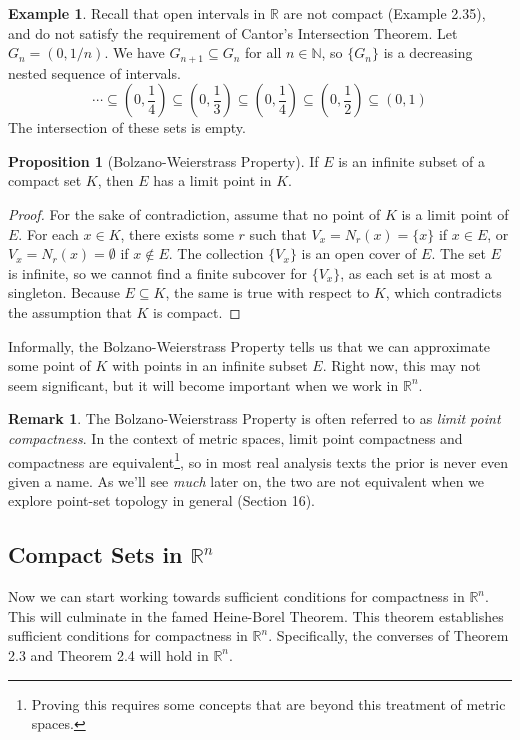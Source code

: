 \documentclass{article}
\newcommand{\N}{\mathbb{N}}
\newcommand{\R}{\mathbb{R}}
\theoremstyle{definition}
\newtheorem{proposition}{Proposition}[section]
\newtheorem{example}{Example}[section]
\newtheorem{remark}{Remark}[section]
\begin{document}
	\begin{example}
		Recall that open intervals in $ \R $ are not compact (Example 2.35), and do not satisfy the requirement of Cantor's Intersection Theorem. Let $ G_{n}=(0,1/n) $. We have $ G_{n+1}\subseteq G_{n} $ for all $ n\in\N $, so $ \{G_n\} $ is a decreasing nested sequence of intervals. $$ \cdots\subseteq \left(0,\frac{1}{4}\right)\subseteq\left(0,\frac{1}{3}\right)\subseteq\left(0,\frac{1}{4}\right)\subseteq\left(0,\frac{1}{2}\right)\subseteq(0,1)$$  
		The intersection of these sets is empty.	
	\end{example}
	\begin{proposition}[Bolzano-Weierstrass Property]
		If $ E $ is an infinite subset of a compact set $ K $, then $ E $ has a limit point in $ K $. 
	\end{proposition}
	\begin{proof}
		For the sake of contradiction, assume that no point of $ K $ is a limit point of $ E $. For each $ x\in K $, there exists some $ r $ such that $ V_x=N_r(x)=\{x\}  $ if $ x\in E $, or $ V_x=N_r(x)=\emptyset $ if $ x\notin E $. The collection $ \{V_x\} $ is an open cover of $ E $. The set $ E $ is infinite, so we cannot find a finite subcover for $ \{V_x\} $, as each set is at most a singleton. Because $ E\subseteq K $, the same is true with respect to $ K $, which contradicts the assumption that $ K $ is compact. 
	\end{proof}
	Informally, the Bolzano-Weierstrass Property tells us that we can approximate some point of $ K $ with points in an infinite subset $ E $. Right now, this may not seem significant, but it will become important when we work in $ \R^n $. 
	\begin{remark}
		The Bolzano-Weierstrass Property is often referred to as \textit{\color{red}limit point compactness}. In the context of metric spaces, limit point compactness and compactness are equivalent\footnote{Proving this requires some concepts that are beyond this treatment of metric spaces.}, so in most real analysis texts the prior is never even given a name. As we'll see \textit{much} later on, the two are not equivalent when we explore point-set topology in general (Section 16).   
	\end{remark} 
	\subsection{Compact Sets in $ \R^n $}
	Now we can start working towards sufficient conditions for compactness in $ \R^n $. This will culminate in the famed Heine-Borel Theorem. This theorem establishes sufficient conditions for compactness in $ \R^n $. Specifically, the converses of Theorem 2.3 and Theorem 2.4 will hold in $ \R^n $.  
	
\end{document}
